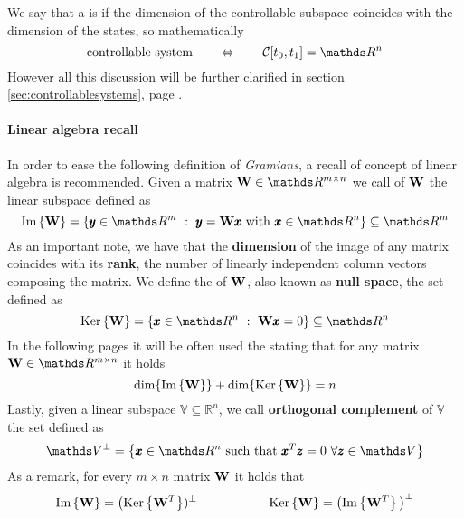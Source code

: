 	We say that a  is  if the dimension of the controllable subspace coincides with the dimension of the states, so mathematically
	\begin{equation} \label{eq:gram:controllable}
		\textrm{controllable system} \qquad \Leftrightarrow \qquad \ctr[t_0,t_1] = \mathds R^n
	\end{equation}
	However all this discussion will be further clarified in section \ref{sec:controllablesystems}, page \pageref{sec:controllablesystems}.
	
	\paragraph{Linear algebra recall} In order to ease the following definition of \textit{Gramians}, a recall of concept of linear algebra is recommended. Given a matrix $\mat W \in \mathds R^{m\times n}$ we call  of $\mathbf{W}$ the linear subspace defined as
	\begin{equation}
		\image{\mat W} = \left\{ \y \in \mathds R^m \ : \ \y = \mat W \x \textrm{ with } \x \in \mathds R^n \right\} \subseteq \mathds R^m
	\end{equation}
	As an important note, we have that the \textbf{dimension} of the image of any matrix coincides with its \textbf{rank}, the number of linearly independent column vectors composing the matrix. We define the  of $\mathbf{W}$, also known as \textbf{null space}, the set defined as
	\begin{equation}
		\kernel{\mat W} = \left\{ \x \in \mathds R^n \ : \ \mat W \x = 0 \right\} \subseteq \mathds R^n
	\end{equation}
	In the following pages it will be often used the  stating that for any matrix $\mat W \in \mathds R^{m\times n}$ it holds
	\begin{equation}
		\textrm{dim}\{\textrm{Im}\left\{\mathbf{W}\right\}\} + \textrm{dim}\{\textrm{Ker}\left\{\mathbf{W}\right\}\} = n
	\end{equation}
	Lastly, given a linear subspace $\mathds V \subseteq \mathds R^n$, we call \textbf{orthogonal complement} of $\mathds V$ the set defined as
	\[ \mathds V^\perp = \left\{ \x \in \mathds R^n \textrm{ such that } \x^T \z = 0 \ \forall \z \in \mathds V \right\} \]
	As a remark, for every $m\times n$ matrix $\mathbf{W}$ it holds that
	\[ \textrm{Im}\left\{\mathbf{W}\right\} = \big(\textrm{Ker}\left\{\mathbf{W}^T\right\})^\perp \hspace{2cm} \textrm{Ker}\left\{\mathbf{W}\right\} = \big(\textrm{Im}\left\{\mathbf{W}^T\right\}\big)^\perp \]
	

